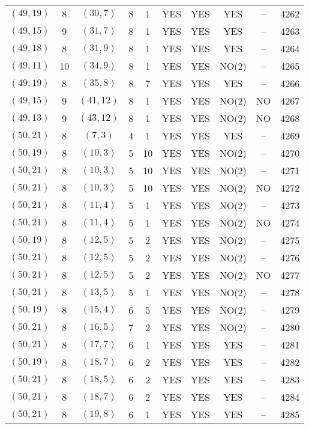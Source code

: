 \begin{longtable}{|c|c|c|c|c|c|c|c|c|c|}
$(49, 19)$ & 8 & $(30, 7)$ & 8 & 1 & YES & YES & YES & -- & 4262\\
$(49, 15)$ & 9 & $(31, 7)$ & 8 & 1 & YES & YES & YES & -- & 4263\\
$(49, 18)$ & 8 & $(31, 9)$ & 8 & 1 & YES & YES & YES & -- & 4264\\
$(49, 11)$ & 10 & $(34, 9)$ & 8 & 1 & YES & YES & NO(2) & -- & 4265\\
$(49, 19)$ & 8 & $(35, 8)$ & 8 & 7 & YES & YES & YES & -- & 4266\\
$(49, 15)$ & 9 & $(41, 12)$ & 8 & 1 & YES & YES & NO(2) & NO & 4267\\
$(49, 13)$ & 9 & $(43, 12)$ & 8 & 1 & YES & YES & NO(2) & NO & 4268\\
$(50, 21)$ & 8 & $(7, 3)$ & 4 & 1 & YES & YES & YES & -- & 4269\\
$(50, 19)$ & 8 & $(10, 3)$ & 5 & 10 & YES & YES & NO(2) & -- & 4270\\
$(50, 21)$ & 8 & $(10, 3)$ & 5 & 10 & YES & YES & NO(2) & -- & 4271\\
$(50, 21)$ & 8 & $(10, 3)$ & 5 & 10 & YES & YES & NO(2) & NO & 4272\\
$(50, 21)$ & 8 & $(11, 4)$ & 5 & 1 & YES & YES & NO(2) & -- & 4273\\
$(50, 21)$ & 8 & $(11, 4)$ & 5 & 1 & YES & YES & NO(2) & NO & 4274\\
$(50, 19)$ & 8 & $(12, 5)$ & 5 & 2 & YES & YES & NO(2) & -- & 4275\\
$(50, 21)$ & 8 & $(12, 5)$ & 5 & 2 & YES & YES & NO(2) & -- & 4276\\
$(50, 21)$ & 8 & $(12, 5)$ & 5 & 2 & YES & YES & NO(2) & NO & 4277\\
$(50, 21)$ & 8 & $(13, 5)$ & 5 & 1 & YES & YES & NO(2) & -- & 4278\\
$(50, 19)$ & 8 & $(15, 4)$ & 6 & 5 & YES & YES & NO(2) & -- & 4279\\
$(50, 21)$ & 8 & $(16, 5)$ & 7 & 2 & YES & YES & NO(2) & -- & 4280\\
$(50, 21)$ & 8 & $(17, 7)$ & 6 & 1 & YES & YES & YES & -- & 4281\\
$(50, 19)$ & 8 & $(18, 7)$ & 6 & 2 & YES & YES & YES & -- & 4282\\
$(50, 21)$ & 8 & $(18, 5)$ & 6 & 2 & YES & YES & YES & -- & 4283\\
$(50, 21)$ & 8 & $(18, 7)$ & 6 & 2 & YES & YES & YES & -- & 4284\\
$(50, 21)$ & 8 & $(19, 8)$ & 6 & 1 & YES & YES & YES & -- & 4285\\

\end{longtable}
